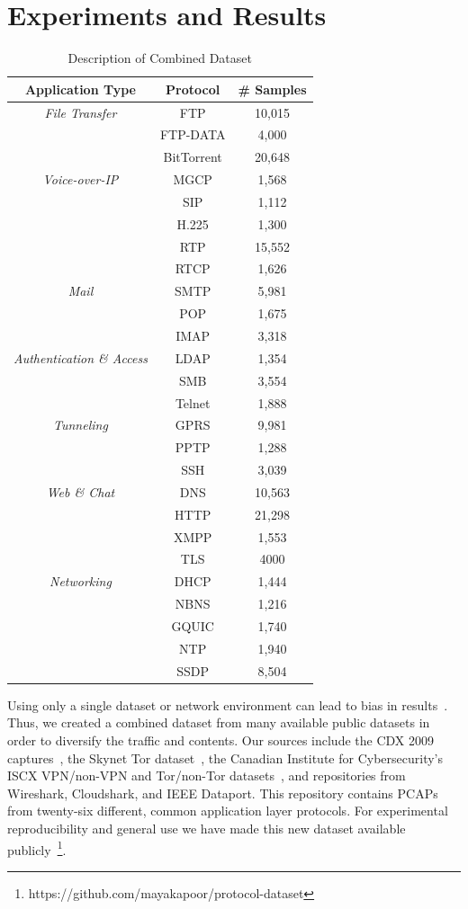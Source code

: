 \section{Experiments and Results}
\begin{table} [ht!]
\caption{Description of Combined Dataset}
\centering
\begin{tabular}{|c |c | c |}
\hline
\textbf{Application Type} & \textbf{Protocol} & \textbf{\# Samples} \\
\hline
\hline
\textit{File Transfer} & FTP & 10,015 \\
& FTP-DATA & 4,000 \\
& BitTorrent &  20,648 \\
\hline
\hline
\textit{Voice-over-IP} & MGCP & 1,568 \\
& SIP & 1,112 \\
& H.225 &  1,300 \\
& RTP &  15,552 \\
& RTCP &  1,626 \\
\hline
\hline
\textit{Mail} & SMTP & 5,981 \\
& POP & 1,675 \\
& IMAP &  3,318 \\
\hline
\hline
\textit{Authentication \& Access} & LDAP & 1,354 \\
& SMB &  3,554 \\
& Telnet & 1,888 \\
\hline
\hline
\textit{Tunneling} & GPRS & 9,981 \\
& PPTP & 1,288 \\
& SSH & 3,039 \\
\hline
\hline
\textit{Web \& Chat} & DNS & 10,563 \\
& HTTP & 21,298 \\
& XMPP &  1,553 \\
& TLS & 4000 \\
\hline
\hline
\textit{Networking} & DHCP & 1,444 \\
& NBNS & 1,216 \\
& GQUIC &  1,740 \\
& NTP & 1,940 \\
& SSDP &  8,504 \\
\hline
\end{tabular}
\label{table:dataset}
\end{table}

Using only a single dataset or network environment can lead to bias in results~\cite{Silva2022}. Thus, we created a combined dataset from many available public datasets in order to diversify the traffic and contents. Our sources include the CDX 2009 captures~\cite{cdx2009}, the Skynet Tor dataset~\cite{skynet}, the Canadian Institute for Cybersecurity's ISCX VPN/non-VPN and Tor/non-Tor datasets~\cite{vpn-dataset, tor-dataset}, and repositories from Wireshark, Cloudshark, and IEEE Dataport. This repository contains PCAPs from twenty-six different, common application layer protocols. For experimental reproducibility and general use we have made this new dataset available publicly~\footnote{https://github.com/mayakapoor/protocol-dataset}.


